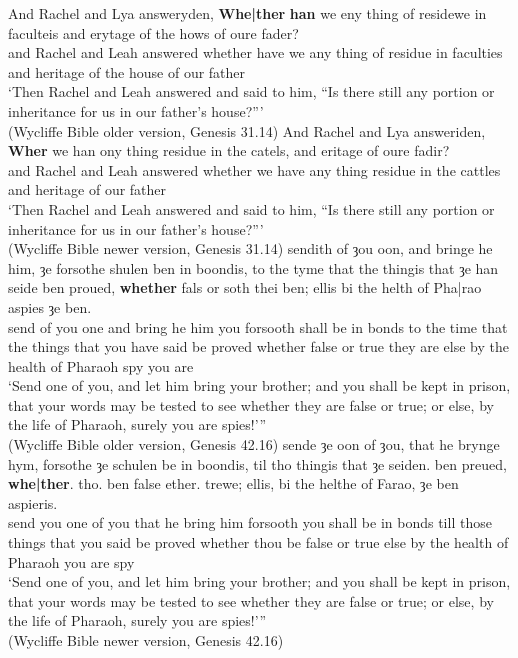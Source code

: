 \ea \label{mepolalt}
\ea \gll And Rachel and Lya answeryden, \textbf{Whe|ther} \textbf{han} we eny thing of residewe in faculteis and erytage of the hows of oure fader?\\
and Rachel and Leah answered whether have we any thing of residue in faculties and heritage of the house of our father\\
\glt `Then Rachel and Leah answered and said to him, ``Is there still any portion or inheritance for us in our father's house?'''\\
(Wycliffe Bible older version, Genesis 31.14)
\ex \gll And Rachel and Lya answeriden, \textbf{Wher} we han ony thing residue in the catels, and eritage of oure fadir?\\
and Rachel and Leah answered whether we have any thing residue in the cattles and heritage of our father\\
\glt `Then Rachel and Leah answered and said to him, ``Is there still any portion or inheritance for us in our father's house?'''\\
(Wycliffe Bible newer version, Genesis 31.14)
\ex \gll sendith of ȝou oon, and bringe he him, ȝe forsothe shulen ben in boondis, to the tyme that the thingis that ȝe han seide ben proued, \textbf{whether} fals or soth thei ben; ellis bi the helth of Pha|rao aspies ȝe ben.\\
send of you one and bring he him you forsooth shall be in bonds to the time that the things that you have said be proved whether false or true they are else by the health of Pharaoh spy you are\\
\glt `Send one of you, and let him bring your brother; and you shall be kept in prison, that your words may be tested to see whether they are false or true; or else, by the life of Pharaoh, surely you are spies!'''\\
(Wycliffe Bible older version, Genesis 42.16)
\ex \gll sende ȝe oon of ȝou, that he brynge hym, forsothe ȝe schulen be in boondis, til tho thingis that ȝe seiden. ben preued, \textbf{whe|ther}. tho. ben false ether. trewe; ellis, bi the helthe of Farao, ȝe ben aspieris.\\
send you one of you that he bring him forsooth you shall be in bonds till those things that you said be proved whether thou be false or true else by the health of Pharaoh you are spy\\
\glt `Send one of you, and let him bring your brother; and you shall be kept in prison, that your words may be tested to see whether they are false or true; or else, by the life of Pharaoh, surely you are spies!'''\\
(Wycliffe Bible newer version, Genesis 42.16)
\z
\z

